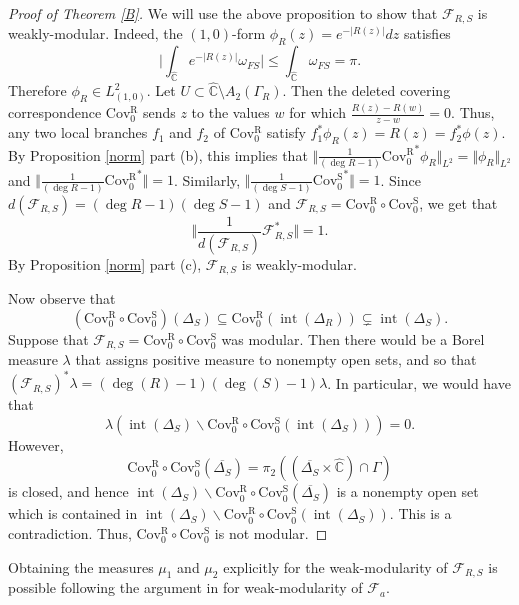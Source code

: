 \documentclass[11pt,letterpaper]{article}
\theoremstyle{definition}
\def\covr{\operatorname{Cov^R_0}}
\def\covs{\operatorname{Cov^S_0}}
\def\interior{\operatorname{int}}
\def\F{\mathcal{F}_a}
\begin{document}
\begin{proof}[Proof of Theorem \ref{B}]
We will use the above proposition to show that $\mathcal{F}_{R,S}$ is weakly-modular. Indeed, the $(1,0)$-form $\phi_R(z)=e^{-|R(z)|}dz$ satisfies
$$\Big|\int_{\widehat{\mathbb{C}}}e
^{-|R(z)|}\omega_{FS}\Big|\leq\int_{\widehat{\mathbb{C}}}\omega_{FS}=\pi.$$ Therefore $\phi_R\in L^2_{(1,0)}$. Let $U\subset \widehat{\mathbb{C}}\setminus A_2(\Gamma_R)$. Then the deleted covering correspondence $\covr$ sends $z$ to the values $w$ for which $\frac{R(z)-R(w)}{z-w}=0$. Thus, any two local branches $f_1$ and $f_2$ of $\covr$ satisfy $f_1^*\phi_R(z)=R(z)=f_2^*\phi(z)$. By Proposition \ref{norm} part (b), this implies that $\Vert\frac{1}{(\deg R-1)}\covr^*\phi_R\Vert_{L^2}=\Vert\phi_R\Vert_{L^2}$ and $\Vert\frac{1}{(\deg R-1)}\covr^*\Vert=1$. Similarly, $\Vert\frac{1}{(\deg S-1)}\covs^*\Vert=1$. Since $d(\mathcal{F}_{R,S})=(\deg R-1)(\deg S-1)$ and $\mathcal{F}_{R,S}=\covr\circ\covs$, we get that
$$\Big\Vert\frac{1}{d(\mathcal{F}_{R,S})}\mathcal{F}^*_{R,S}\Big\Vert=1.$$
By Proposition \ref{norm} part (c), $\mathcal{F}_{R,S}$ is weakly-modular.

Now observe that
$$\left(\covr\circ\covs\right)(\Delta_S)\subseteq\covr\left(\interior\left(\Delta_R\right)\right)\subsetneq\interior\left(\Delta_S\right).$$
Suppose that $\mathcal{F}_{R,S}=\covr\circ\covs$ was modular. Then there would be a Borel measure $\lambda$ that assigns positive measure to nonempty open sets, and so that $(\mathcal{F}_{R,S})^*\lambda=(\deg(R)-1)(\deg(S)-1)\lambda$. In particular, we would have that 
$$\lambda(\interior(\Delta_S)\smallsetminus\covr\circ\covs(\interior(\Delta_S)))=0.$$
However,
$$\covr\circ\covs(\overline{\Delta_S})=\pi_2((\overline{\Delta_S}\times\widehat{\mathbb{C}})\cap\Gamma)$$
is closed, and hence $\interior(\Delta_S)\smallsetminus\covr\circ\covs(\overline{\Delta_S})$ is a nonempty open set which is contained in $\interior(\Delta_S)\smallsetminus\covr\circ\covs(\interior(\Delta_S))$. This is a contradiction. Thus, $\covr\circ\covs$ is not modular.
\end{proof}

Obtaining the measures $\mu_1$ and $\mu_2$ explicitly for the weak-modularity of $\mathcal{F}_{R,S}$ is possible following the argument in \cite{Mat23} for weak-modularity of $\F$. 

\end{document}
